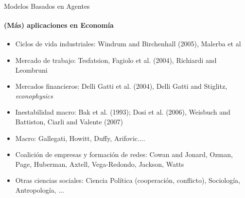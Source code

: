 \documentclass[11pt]{beamer}
\begin{document}
\begin{frame}
\begin{frame}{Modelos Basados en Agentes}
    \framesubtitle{(Más) aplicaciones en Economía}
    \begin{itemize}
        \item Ciclos de vida industriales: Windrum and Birchenhall (2005), Malerba et al
\item Mercado de trabajo: Tesfatsion, Fagiolo et al. (2004), Richiardi and Leombruni
\item Mercados financieros: Delli Gatti et al. (2004), Delli Gatti and Stiglitz,  \textit{econophysics}
\item Inestabilidad macro: Bak et al. (1993); Dosi et al. (2006), Weisbuch and Battiston, Ciarli and Valente (2007)
\item Macro: Gallegati, Howitt, Duffy, Arifovic....
\item Coalición de empresas y formación de redes: Cowan and Jonard, Ozman, Page, Huberman, Axtell, Vega-Redondo, Jackson, Watts
\item Otras ciencias sociales: Ciencia Política (cooperación, conflicto), Sociología, Antropología, ...
    \end{itemize}
\end{frame}

\begin{comment}
\begin{frame}{Modelos Basados en Agentes}
    \framesubtitle{Cellular automata}
    \begin{itemize}
\small        \item \textit{``At a very general level, one might say that computation is what a complex system does with information in order to succeed or adapt in its environment.''} Mitchell (2009, ch. 10, p. 146)
\small \item The CA is a kind of complex system where the agents (cell) can change its status or move to another place according to a set of disposal simple rule and depending of the status of its neighborhood. The CA generally is represented in a Lattice (grid) of cells.
    \end{itemize}
   \textcolor{blue}{Game of Life (Conway) and Wolfram Cellular Automata}
    \begin{figure}
        \centering
        \texttt{[image: figuras/conway1.png]}
        \texttt{[image: figuras/conway2.png]}
        \texttt{[image: figuras/conway3.png]}
        \label{fig:my_label}
    \end{figure}
\end{frame}


\end{comment}
\end{frame}
\end{document}
